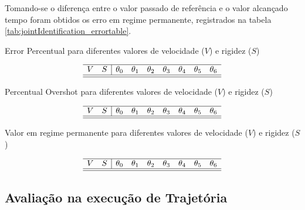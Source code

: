Tomando-se o diferença entre o valor passado de referência e o valor alcançado tempo foram obtidos os erro em regime permanente, registrados na tabela \ref{tab:jointIdentification_errortable}.

\begin{table}[H]
    \centering
    \caption{Error Percentual para diferentes valores de velocidade ($V$) e rigidez ($S$)}
    $$\begin{array}{cc|ccccccc}
         \hline
         V & S & \theta_0 & \theta_1 & \theta_2 & \theta_3 & \theta_4 & \theta_5 & \theta_6\\
         \hline
         
         \hline
    \end{array}$$
    \label{tab:jointIdentification_errortable}
\end{table}

\begin{table}[H]
    \centering
    \caption{Percentual Overshot para diferentes valores de velocidade ($V$) e rigidez ($S$)}
    $$\begin{array}{cc|ccccccc}
         \hline
         V & S & \theta_0 & \theta_1 & \theta_2 & \theta_3 & \theta_4 & \theta_5 & \theta_6\\
         \hline
         
         \hline
    \end{array}$$
    \label{tab:jointIdentification_overshottable}
\end{table}

\begin{table}[H]
    \centering
    \caption{Valor em regime permanente para diferentes valores de velocidade ($V$) e rigidez ($S$)}
    $$\begin{array}{cc|ccccccc}
         \hline
         V & S & \theta_0 & \theta_1 & \theta_2 & \theta_3 & \theta_4 & \theta_5 & \theta_6\\
         \hline
         
         \hline
    \end{array}$$
    \label{tab:jointIdentification_steadstatetable}
\end{table}


\subsection{Avaliação na execução de Trajetória}

